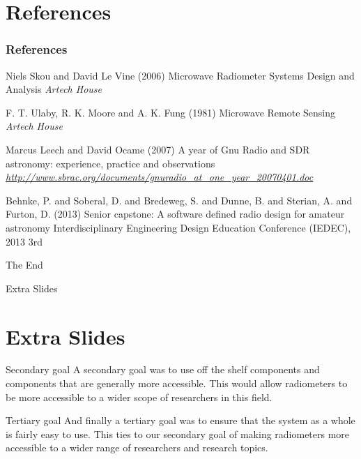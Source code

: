 \documentclass{beamer}
\begin{document}
\section{References}
\begin{frame}
\frametitle{References}
\footnotesize{
\begin{thebibliography}{99}
 Niels Skou and David Le Vine (2006)
\newblock Microwave Radiometer Systems Design and Analysis
\newblock \emph{Artech House}

 F. T. Ulaby, R. K. Moore and A. K. Fung (1981)
\newblock Microwave Remote Sensing
\newblock \emph{Artech House}

 Marcus Leech and David Ocame (2007)
\newblock A year of Gnu Radio and SDR astronomy: experience, practice and observations
\newblock \emph{\url{http://www.sbrac.org/documents/gnuradio_at_one_year_20070401.doc}}

 Behnke, P. and Soberal, D. and Bredeweg, S. and Dunne, B. and Sterian, A. and Furton, D. (2013)
\newblock Senior capstone: A software defined radio design for amateur astronomy
\newblock Interdisciplinary Engineering Design Education Conference (IEDEC), 2013 3rd

\end{thebibliography}
}
\end{frame}

\begin{frame}
\Huge{\centerline{The End}}
\end{frame}

\begin{frame}
\Huge{\centerline{Extra Slides}}
\end{frame}
\section*{Extra Slides}

\begin{frame}
\begin{block}{Secondary goal}
A secondary goal was to use off the shelf components and components that are generally more accessible.  This would allow radiometers to be more accessible to a wider scope of researchers in this field.
\end{block} 

\begin{block}{Tertiary goal}
And finally a tertiary goal was to ensure that the system as a whole is fairly easy to use.  This ties to our secondary goal of making radiometers more accessible to a wider range of researchers and research topics.
\end{block}
\end{frame}
\end{document}
